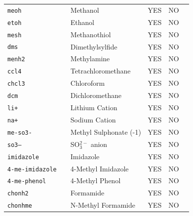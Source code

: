 \documentclass[a4paper,titlepage,twoside,fleqn,12pt]{book}
\begin{document}
\begin{refsection}
\begin{table}[t!]
\begin{tabular*}{1.0\textwidth}{@{\extracolsep{\fill} } lllll}
 \tt{meoh            } & Methanol                        & YES  &   NO     &                                          \\
 \tt{etoh            } & Ethanol                         & YES  &   NO     &                                          \\
 \tt{mesh            } & Methanothiol                    & YES  &   NO     &                                          \\
 \tt{dms             } & Dimethylsylfide                 & YES  &   NO     &                                          \\
 \tt{menh2           } & Methylamine                     & YES  &   NO     &                                          \\
 \tt{ccl4            } & Tetrachloromethane              & YES  &   NO     &                                          \\
 \tt{chcl3           } & Chloroform                      & YES  &   NO     &                                          \\
 \tt{dcm             } & Dichloromethane                 & YES  &   NO     &                                          \\
 \tt{li+             } & Lithium Cation                  & YES  &   NO     &                                          \\
 \tt{na+             } & Sodium Cation                   & YES  &   NO     &                                          \\
 \tt{me-so3-         } & Methyl Sulphonate (-1)          & YES  &   NO     &                                          \\
 \tt{so3--           } & SO$_3^{2-}$ anion               & YES  &   NO     &                                          \\
 \tt{imidazole       } & Imidazole                       & YES  &   NO     &                                          \\
 \tt{4-me-imidazole  } & 4-Methyl Imidazole              & YES  &   NO     &                                          \\
 \tt{4-me-phenol     } & 4-Methyl Phenol                 & YES  &   NO     &                                          \\
 \tt{chonh2          } & Formamide                       & YES  &   NO     &                                          \\
 \tt{chonhme         } & N-Methyl Formamide              & YES  &   NO     &                                          \\

\end{tabular*}
\end{table}
\end{refsection}
\end{document}
